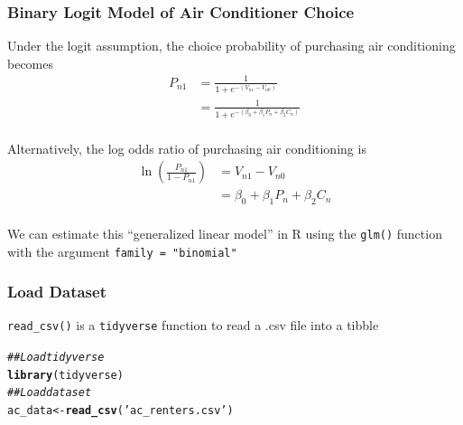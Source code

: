\documentclass{beamer}\usepackage[]{graphicx}\usepackage[]{xcolor}
\makeatletter
\newcommand{\hlstr}[1]{\textcolor[rgb]{0.192,0.494,0.8}{#1}}%
\newcommand{\hlcom}[1]{\textcolor[rgb]{0.678,0.584,0.686}{\textit{#1}}}%
\newcommand{\hlstd}[1]{\textcolor[rgb]{0.345,0.345,0.345}{#1}}%
\newcommand{\hlkwb}[1]{\textcolor[rgb]{0.69,0.353,0.396}{#1}}%
\newcommand{\hlkwd}[1]{\textcolor[rgb]{0.737,0.353,0.396}{\textbf{#1}}}%
\newenvironment{kframe}{%
 \def\at@end@of@kframe{}%
 \ifinner\ifhmode%
  \def\at@end@of@kframe{\end{minipage}}%
  \begin{minipage}{\columnwidth}%
 \fi\fi%
 \def\FrameCommand##1{\hskip\@totalleftmargin \hskip-\fboxsep
 \colorbox{shadecolor}{##1}\hskip-\fboxsep
     \hskip-\linewidth \hskip-\@totalleftmargin \hskip\columnwidth}%
 \MakeFramed {\advance\hsize-\width
   \@totalleftmargin\z@ \linewidth\hsize
   \@setminipage}}%
 {\par\unskip\endMakeFramed%
 \at@end@of@kframe}
\newenvironment{knitrout}{}{} %
\makeatother
\begin{document}
\begin{frame}\frametitle{Binary Logit Model of Air Conditioner Choice}
    Under the logit assumption, the choice probability of purchasing air conditioning becomes
    \begin{align*}
        P_{n1} & = \frac{1}{1 + e^{-(V_{n1} - V_{n0})}} \\
        & = \frac{1}{1 + e^{-(\beta_0 + \beta_1 P_n + \beta_2 C_n)}}
    \end{align*} \\
    \vspace{2ex}
    Alternatively, the log odds ratio of purchasing air conditioning is
    \begin{align*}
        \ln \left( \frac{P_{n1}}{1 - P_{n1}} \right) & = V_{n1} - V_{n0} \\
        & = \beta_0 + \beta_1 P_n + \beta_2 C_n
    \end{align*} \\
    \vspace{2ex}
    We can estimate this ``generalized linear model'' in R using the \texttt{glm()} function with the argument \texttt{family = "binomial"}
\end{frame}

\begin{frame}[fragile]\frametitle{Load Dataset}
    \texttt{read\_csv()} is a \texttt{tidyverse} function to read a .csv file into a tibble
\begin{knitrout}\footnotesize
{}\color{fgcolor}\begin{kframe}
\begin{alltt}
\hlcom{## Load tidyverse}
\hlkwd{library}\hlstd{(tidyverse)}
\hlcom{## Load dataset}
\hlstd{ac_data} \hlkwb{<-} \hlkwd{read_csv}\hlstd{(}\hlstr{'ac_renters.csv'}\hlstd{)}
\end{alltt}
\end{kframe}
\end{knitrout}
\end{frame}
\end{document}
